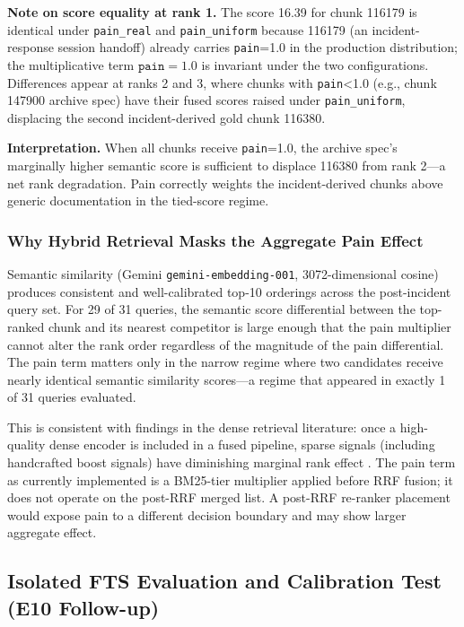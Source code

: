 \textbf{Note on score equality at rank 1.} The score 16.39 for chunk 116179 is identical
under \texttt{pain\_real} and \texttt{pain\_uniform} because 116179 (an incident-response
session handoff) already carries \texttt{pain}=1.0 in the production distribution; the
multiplicative term $\texttt{pain}=1.0$ is invariant under the two configurations.
Differences appear at ranks 2 and 3, where chunks with \texttt{pain}<1.0 (e.g., chunk
147900 archive spec) have their fused scores raised under \texttt{pain\_uniform},
displacing the second incident-derived gold chunk 116380.

\textbf{Interpretation.} When all chunks receive \texttt{pain}=1.0, the archive spec's
marginally higher semantic score is sufficient to displace 116380 from rank 2---a net rank
degradation. Pain correctly weights the incident-derived chunks above generic documentation
in the tied-score regime.

\subsubsection{Why Hybrid Retrieval Masks the Aggregate Pain Effect}

Semantic similarity (Gemini \texttt{gemini-embedding-001}, 3072-dimensional cosine)
produces consistent and well-calibrated top-10 orderings across the post-incident query
set. For 29 of 31 queries, the semantic score differential between the top-ranked chunk and
its nearest competitor is large enough that the pain multiplier cannot alter the rank order
regardless of the magnitude of the pain differential. The pain term matters only in the
narrow regime where two candidates receive nearly identical semantic similarity
scores---a regime that appeared in exactly 1 of 31 queries evaluated.

This is consistent with findings in the dense retrieval literature: once a high-quality
dense encoder is included in a fused pipeline, sparse signals (including handcrafted boost
signals) have diminishing marginal rank effect \cite{thakur2021beir}. The pain term as
currently implemented is a BM25-tier multiplier applied before RRF fusion; it does not
operate on the post-RRF merged list. A post-RRF re-ranker placement would expose pain to
a different decision boundary and may show larger aggregate effect.

\subsection{Isolated FTS Evaluation and Calibration Test (E10 Follow-up)}
\label{sec:calibration-test}

